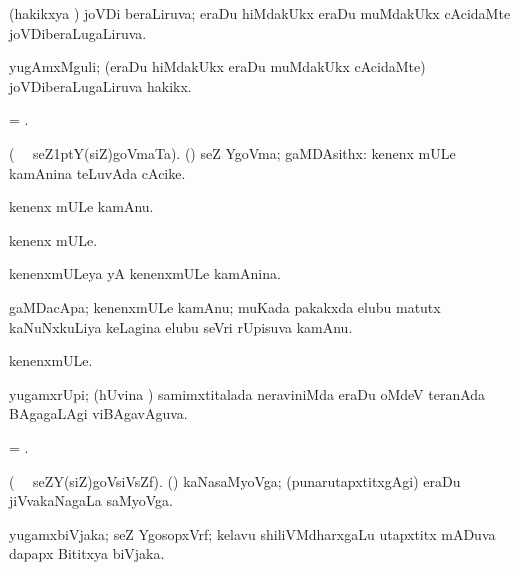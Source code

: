 \bentry
{} 
\gl{\gu} 
\bmng
(hakikxya \vi) joVDi beraLiruva; eraDu hiMdakUkx eraDu muMdakUkx cAcidaMte joVDiberaLugaLiruva. \quad {}
\emng
\eentry

\bentry
{} 
\gl{\nA} 
\bmng
yugAmxMguli; (eraDu hiMdakUkx eraDu muMdakUkx cAcidaMte) joVDiberaLugaLiruva hakikx.
\emng
\eentry

\bentry
{} 
\gl{\gu}
\bmng
= .
\emng
\eentry

\bentry
{} 
\gl{\nA} 
\bmng
(\bava\   \ucAcx\  seZ\kern1ptY(siZ)goVmaTa).  
(\aMrashA) seZ YgoVma; gaMDAsithx: 
\banum
{}  kenenx mULe kamAnina teLuvAda  cAcike. 

 kenenx mULe kamAnu. 

 kenenx  mULe.
\eanum
\emng 
\eentry

\bentry
{} 
\gl{\gu} 
\bmng
kenenxmULeya yA kenenxmULe kamAnina.
\emng
\eentry

\bentry
{} 
\gl{\nA} 
\bmng
gaMDacApa;  kenenxmULe kamAnu; muKada pakakxda elubu  matutx kaNuNxkuLiya  keLagina elubu seVri rUpisuva kamAnu.
\emng
\eentry

\bentry
{} 
\gl{\nA} 
\bmng
kenenxmULe.
\emng
\eentry

\bentry
{} 
\gl{\gu} 
\bmng
yugamxrUpi; (hUvina \vi) samimxtitalada neraviniMda eraDu oMdeV teranAda BAgagaLAgi viBAgavAguva.
\emng
\eentry

\bentry
{} 
\gl{\gu}  
\bmng
= .
\emng
\eentry

\bentry
{} 
\gl{\nA} 
\bmng
(\bava\  \ucAcx\ seZY(siZ)goVsiVsZf). 
(\jiVvi) kaNasaMyoVga; (punarutapxtitxgAgi) eraDu jiVvakaNagaLa saMyoVga.
\emng
\eentry

\bentry
{}  
\gl{\nA}   
\bmng
yugamxbiVjaka; seZ YgosopxVrf; kelavu shiliVMdharxgaLu utapxtitx mADuva dapapx Bititxya biVjaka.
\emng
\eentry

